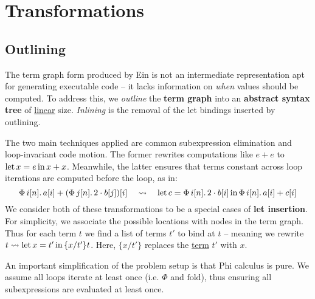 
\section{Transformations}
\label{compiler-transformations}

\subsection{Outlining}

The term graph form produced by Ein is not an intermediate representation apt for generating executable code -- it lacks information on \textit{when} values should be computed. To address this, we \textit{outline} the \textbf{term graph} into an \textbf{abstract syntax tree} of \underline{linear} size.
\textit{Inlining} is the removal of the let bindings inserted by outlining. 

The two main techniques applied are common subexpression elimination and loop-invariant code motion. The former rewrites computations like $e + e$ to  $\mathrm{let}\,{x}={e}\,\mathrm{in}\,{x + x}$. Meanwhile, the latter ensures that terms constant across loop iterations are computed before the loop, as in:
$$ 
\phivec{i}{n}{a[i] + \left( \phivec{j}{n}{2 \cdot b[j]} \right)[i]} \quad\leadsto\quad \philet{c}{\phivec{i}{n}{2 \cdot b[i]}}{\phivec{i}{n}{a[i] + c[i]}} 
$$
We consider both of these transformations to be a special cases of \textbf{let insertion}. 
For simplicity, we associate the possible locations with nodes in the term graph. Thus for each term $t$ we find a list of terms $t'$ to bind at $t$ -- meaning we rewrite $t \leadsto \mathrm{let}\,{x}={t'}\,\mathrm{in}\,{\{x/t'\}t}$. Here, $\{x/t'\}$ replaces the \underline{term} $t'$ with $x$.

An important simplification of the problem setup is that Phi calculus is pure. 
We assume all loops iterate at least once (i.e. $\Phi$ and $\mathrm{fold}$), thus ensuring all subexpressions are evaluated at least once.

